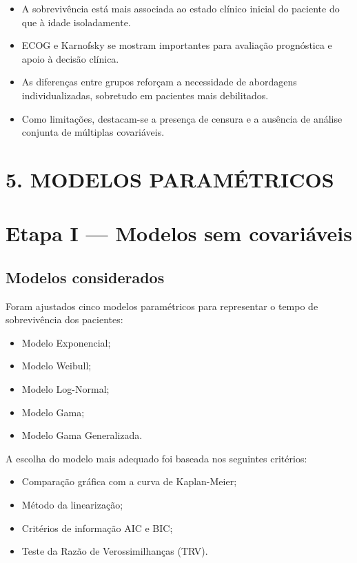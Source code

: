 \documentclass[
  brazilian,
  letterpaper,
  DIV=11,
  numbers=noendperiod]{scrartcl}
\providecommand{\tightlist}{%
  \setlength{\itemsep}{0pt}\setlength{\parskip}{0pt}}
\begin{document}
\begin{itemize}
\item
  A sobrevivência está mais associada ao estado clínico inicial do
  paciente do que à idade isoladamente.
\item
  ECOG e Karnofsky se mostram importantes para avaliação prognóstica e
  apoio à decisão clínica.
\item
  As diferenças entre grupos reforçam a necessidade de abordagens
  individualizadas, sobretudo em pacientes mais debilitados.
\item
  Como limitações, destacam-se a presença de censura e a ausência de
  análise conjunta de múltiplas covariáveis.
\end{itemize}

\section{\texorpdfstring{\textbf{5. MODELOS
PARAMÉTRICOS}}{5. MODELOS PARAMÉTRICOS}}\label{modelos-paramuxe9tricos}

\section{\texorpdfstring{\textbf{Etapa I --- Modelos sem
covariáveis}}{Etapa I --- Modelos sem covariáveis}}\label{etapa-i-modelos-sem-covariuxe1veis}

\subsection{\texorpdfstring{\textbf{Modelos
considerados}}{Modelos considerados}}\label{modelos-considerados}

Foram ajustados cinco modelos paramétricos para representar o tempo de
sobrevivência dos pacientes:

\begin{itemize}
\tightlist
\item
  Modelo Exponencial;
\item
  Modelo Weibull;
\item
  Modelo Log-Normal;
\item
  Modelo Gama;
\item
  Modelo Gama Generalizada.
\end{itemize}

A escolha do modelo mais adequado foi baseada nos seguintes critérios:

\begin{itemize}
\tightlist
\item
  Comparação gráfica com a curva de Kaplan-Meier;
\item
  Método da linearização;
\item
  Critérios de informação AIC e BIC;
\item
  Teste da Razão de Verossimilhanças (TRV).
\end{itemize}
\end{document}
